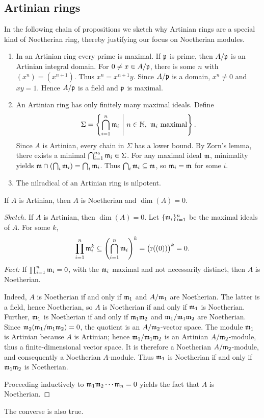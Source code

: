 \documentclass[11pt,a4paper]{article}
\begin{document}
\subsection{Artinian rings}
In the following chain of propositions we sketch why Artinian rings are a special kind of Noetherian ring, thereby justifying our focus on Noetherian modules.
\begin{enumerate}[label=(\roman*)]
\setcounter{enumi}{0}\item In an Artinian ring every prime is maximal. If $\mathfrak p$ is prime, then $A/\mathfrak p$ is an Artinian integral domain. For $0\ne x\in A/\mathfrak p$, there is some $n$ with $(x^n)=(x^{n+1})$. Thus $x^n=x^{n+1}y$. Since $A/\mathfrak p$ is a domain, $x^n\ne0$ and $xy=1$. Hence $A/\mathfrak p$ is a field and $\mathfrak p$ is maximal.
\setcounter{enumi}{1}\item An Artinian ring has only finitely many maximal ideals. Define
\[\Sigma=\left\{\bigcap_{i=1}^n\mm_i\ \middle|\ n\in\N,\ \mm_i\text{ maximal}\right\}.\]
Since $A$ is Artinian, every chain in $\Sigma$ has a lower bound. By Zorn's lemma, there exists a minimal $\bigcap_{i=1}^{n_0}\mathfrak m_i\in\Sigma$. For any maximal ideal $\mathfrak m$, minimality yields $\mathfrak m\cap(\bigcap_i\mathfrak m_i)=\bigcap_i\mathfrak m_i$.
Thus $\bigcap_i\mathfrak m_i\subseteq\mathfrak m$, so $\mathfrak m_i=\mathfrak m$ for some $i$.
\setcounter{enumi}{2}\item The nilradical of an Artinian ring is nilpotent.
\end{enumerate}
\setcounter{theorem}{19}\begin{theorem}
If $A$ is Artinian, then $A$ is Noetherian and $\dim(A)=0$.
\end{theorem}
\begin{proof}[Sketch]
If $A$ is Artinian, then $\dim(A)=0$. Let $\{\mathfrak m_i\}_{i=1}^n$ be the maximal ideals of $A$. For some $k$,
\[
\prod_{i=1}^n\mathfrak m_i^k\subseteq\left(\bigcap_{i=1}^n\mathfrak m_i\right)^k
=\bigl(\mathrm r((0))\bigr)^k=0.
\]
\emph{Fact:} If $\prod_{i=1}^n\mathfrak m_i=0$, with the $\mathfrak m_i$ maximal and not necessarily distinct, then $A$ is Noetherian.

Indeed, $A$ is Noetherian if and only if $\mathfrak m_1$ and $A/\mathfrak m_1$ are Noetherian. The latter is a field, hence Noetherian, so $A$ is Noetherian if and only if $\mathfrak m_1$ is Noetherian. Further, $\mathfrak m_1$ is Noetherian if and only if $\mathfrak m_1\mathfrak m_2$ and $\mathfrak m_1/\mathfrak m_1\mathfrak m_2$ are Noetherian. Since $\mathfrak m_2(\mathfrak m_1/\mathfrak m_1\mathfrak m_2)=0$, the quotient is an $A/\mathfrak m_2$-vector space. The module $\mathfrak m_1$ is Artinian because $A$ is Artinian; hence $\mathfrak m_1/\mathfrak m_1\mathfrak m_2$ is an Artinian $A/\mathfrak m_2$-module, thus a finite-dimensional vector space. It is therefore a Noetherian $A/\mathfrak m_2$-module, and consequently a Noetherian $A$-module. Thus $\mathfrak m_1$ is Noetherian if and only if $\mathfrak m_1\mathfrak m_2$ is Noetherian.

Proceeding inductively to $\mathfrak m_1\mathfrak m_2\cdots\mathfrak m_n=0$ yields the fact that $A$ is Noetherian.
\end{proof}
\begin{remark}
The converse is also true.
\end{remark}
\end{document}
